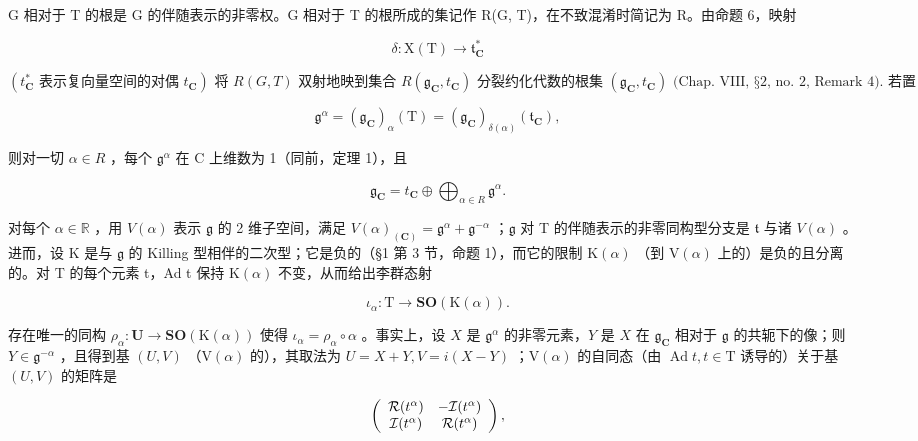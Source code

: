 G 相对于 T 的根是 G 的伴随表示的非零权。G 相对于 T 的根所成的集记作 R(G, T)，在不致混淆时简记为 R。由命题 6，映射

\[
\delta : \mathrm{X(T)} \to \mathfrak {t} _ {\mathbf {C}} ^ {*}
\]

\((t_{\mathbf{C}}^{*} \text{ 表示复向量空间的对偶 } t_{\mathbf{C}}) \text{ 将 } R(G, T) \text{ 双射地映到集合 } R(\mathfrak{g}_{\mathbf{C}}, t_{\mathbf{C}}) \text{ 分裂约化代数的根集 } (\mathfrak{g}_{\mathbf{C}}, t_{\mathbf{C}}) \text{ (Chap. VIII, §2, no. 2, Remark 4). 若置}\)

\[
\mathfrak {g} ^ {\alpha} = (\mathfrak {g} _ {\mathbf {C}}) _ {\alpha} (\mathrm{T}) = (\mathfrak {g} _ {\mathbf {C}}) _ {\delta (\alpha)} (\mathfrak {t} _ {\mathbf {C}}),\tag{11}
\]

则对一切 \(\alpha\in R\) ，每个 \(\mathfrak{g}^{\alpha}\) 在 C 上维数为 1（同前，定理 1），且

\[
\mathfrak {g} _ {\mathbf {C}} = t _ {\mathbf {C}} \oplus \bigoplus_ {\alpha \in R} \mathfrak {g} ^ {\alpha}.\tag{12}
\]

对每个 \(\alpha \in \mathbb{R}\) ，用 \(V(\alpha)\) 表示 \(\mathfrak{g}\) 的 2 维子空间，满足 \(V(\alpha)_{(\mathbf{C})} = \mathfrak{g}^{\alpha} + \mathfrak{g}^{-\alpha}\) ；\(\mathfrak{g}\) 对 T 的伴随表示的非零同构型分支是 \(\mathfrak{t}\) 与诸 \(V(\alpha)\) 。进而，设 K 是与 \(\mathfrak{g}\) 的 Killing 型相伴的二次型；它是负的（§1 第 3 节，命题 1），而它的限制 \(\mathrm{K}(\alpha)\) （到 \(\mathrm{V}(\alpha)\) 上的）是负的且分离的。对 T 的每个元素 t，Ad t 保持 \(\mathrm{K}(\alpha)\) 不变，从而给出李群态射

\[
\iota_ {\alpha}: \mathrm{T} \to \mathbf {S O} (\mathrm{K} (\alpha)).
\]

存在唯一的同构 \(\rho_{\alpha}:\mathbf{U}\to \mathbf{SO}(\mathrm{K}(\alpha))\) 使得 \(\iota_{\alpha} = \rho_{\alpha}\circ \alpha\) 。事实上，设 \(X\) 是 \(\mathfrak{g}^{\alpha}\) 的非零元素，\(Y\) 是 \(X\) 在 \(\mathfrak{g}_{\mathbf{C}}\) 相对于 \(\mathfrak{g}\) 的共轭下的像；则 \(Y\in \mathfrak{g}^{-\alpha}\) ，且得到基 \((U,V)\) （\(\mathrm{V}(\alpha)\) 的），其取法为 \(U = X + Y,V = i(X - Y)\) ；\(\mathrm{V}(\alpha)\) 的自同态（由 \(\operatorname {Ad}t,t\in \mathrm{T}\) 诱导的）关于基 \((U,V)\) 的矩阵是

\[
\left( \begin{array}{c c} \mathcal {R} (t ^ {\alpha}) & - \mathcal {I} (t ^ {\alpha}) \\ \mathcal {I} (t ^ {\alpha}) & \mathcal {R} (t ^ {\alpha}) \end{array} \right),
\]

